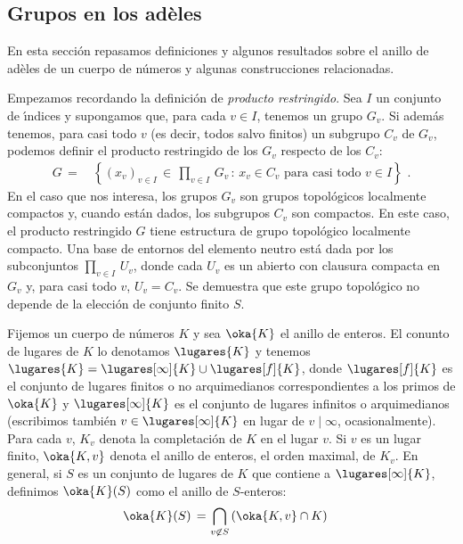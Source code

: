 % 

\subsection{Grupos en los ad\`{e}les}
En esta secci\'{o}n repasamos definiciones y algunos resultados sobre el
anillo de ad\`{e}les de un cuerpo de n\'{u}meros y algunas construcciones
relacionadas.

Empezamos recordando la definici\'{o}n de \emph{producto restringido}.
Sea $I$ un conjunto de \'{\i}ndices y supongamos que, para cada $v\in I$,
tenemos un grupo $G_{v}$. Si adem\'{a}s tenemos, para casi todo $v$
(es decir, todos salvo finitos) un subgrupo $C_{v}$ de $G_{v}$, podemos
definir el producto restringido de los $G_{v}$ respecto de los $C_{v}$:
\begin{align*}
 G \,=\, & \left\lbrace (x_{v})_{v\in I}\,\in\,\prod_{v\in I}\,G_{v}\,:\,
	x_{v}\in C_{v}\text{ para casi todo }v\in I\right\rbrace
	\text{ .}
\end{align*}
%
En el caso que nos interesa, los grupos $G_{v}$ son grupos topol\'{o}gicos
localmente compactos y, cuando est\'{a}n dados, los subgrupos $C_{v}$ son
compactos. En este caso, el producto restringido $G$ tiene estructura de
grupo topol\'{o}gico localmente compacto. Una base de entornos del elemento
neutro est\'{a} dada por los subconjuntos $\prod_{v\in I}\,U_{v}$, donde
cada $U_{v}$ es un abierto con clausura compacta en $G_{v}$ y, para casi todo
$v$, $U_{v}=C_{v}$. Se demuestra que este grupo topol\'{o}gico no depende
de la elecci\'{o}n de conjunto finito $S$.

Fijemos un cuerpo de n\'{u}meros $K$ y sea $\oka{K}$ el anillo de enteros.
El conunto de lugares de $K$ lo denotamos $\lugares{K}$ y tenemos
$\lugares{K}=\lugares[\infty]{K}\cup\lugares[f]{K}$, donde $\lugares[f]{K}$
es el conjunto de lugares finitos o no arquimedianos correspondientes a los
primos de $\oka{K}$ y $\lugares[\infty]{K}$ es el conjunto de lugares
infinitos o arquimedianos (escribimos tambi\'{e}n $v\in\lugares[\infty]{K}$
en lugar de $v\mid\infty$,
ocasionalmente).
Para cada $v$, $K_{v}$ denota la completaci\'{o}n
de $K$ en el lugar $v$. Si $v$ es un lugar finito, $\oka{K,v}$ denota el
anillo de enteros, el orden maximal, de $K_{v}$.
En general, si $S$ es un conjunto de lugares
de $K$ que contiene a $\lugares[\infty]{K}$, definimos $\oka{K}(S)$
como el anillo de $S$-enteros:
\begin{align*}
 \oka{K}(S) \,=\, & \bigcap_{v\not\in S}\,(\oka{K,v}\cap K)
\end{align*}
%

